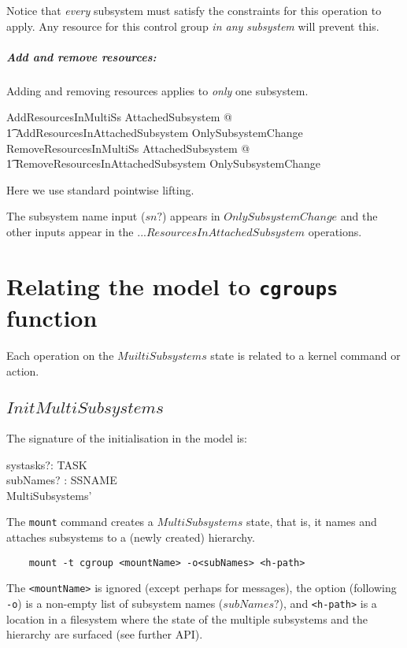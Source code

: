 \documentclass[a4paper,twoside,12pt]{article}
\begin{document}
Notice that \emph{every} subsystem must satisfy the constraints for this operation to apply.
Any resource for this control group \emph{in any subsystem} will prevent this.

\subparagraph{Add and remove resources:}

Adding and removing resources applies to \emph{only} one subsystem.

\begin{zed}
AddResourcesInMultiSs   \exists \Delta AttachedSubsystem @ \\
    \t1 AddResourcesInAttachedSubsystem \land OnlySubsystemChange
\also
RemoveResourcesInMultiSs   \exists \Delta AttachedSubsystem @ \\
    \t1 RemoveResourcesInAttachedSubsystem \land OnlySubsystemChange
\end{zed}
Here we use standard pointwise lifting.

The subsystem name input ($sn?$) appears in $OnlySubsystemChange$
and the other inputs appear in the ...$ResourcesInAttachedSubsystem$ operations.

\section{Relating the model to \texttt{cgroups} function}

Each operation on the $MuiltiSubsystems$ state is related to a kernel command or action. 

\subsection{$InitMultiSubsystems$}

The signature of the initialisation in the model is:

\begin{schema*}
    systasks?: \finset TASK \\
    subNames? : \finset SSNAME \\
\also
  MultiSubsystems'
\end{schema*}
The \texttt{mount} command creates a $MultiSubsystems$ state, that is, it names and attaches subsystems to a 
(newly created) hierarchy.

\begin{verbatim}
    mount -t cgroup <mountName> -o<subNames> <h-path>
\end{verbatim}
The \texttt{<mountName>} is ignored (except perhaps for messages), 
the option (following \texttt{-o}) is a non-empty list of subsystem names
($subNames?$), and \texttt{<h-path>} is a location in a filesystem
where the state of the multiple subsystems and the hierarchy are surfaced (see further API).
\end{document}
